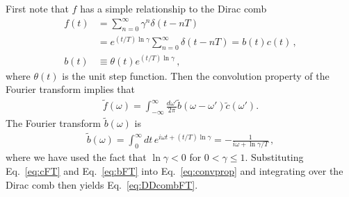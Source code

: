 \begin{refsection}
First note that $f$ has a simple relationship to the Dirac comb
\begin{align}
f(t)&=\sum_{n=0}^{\infty}\gamma^n \delta(t-nT)
\nonumber \\ &
=e^{(t/T) \ln\gamma}\sum_{n=0}^{\infty} \delta(t-nT)
=b(t)c(t) \,, \\
b(t)& \equiv \theta(t)e^{(t/T) \ln\gamma} \,,
\end{align}
where $\theta(t)$ is the unit step function.
Then the convolution property of the Fourier transform implies that 
\begin{align}
\tilde f(\omega)=\int_{-\infty}^{\infty}\frac{d\omega'}{2\pi}\tilde b(\omega -\omega')\tilde c(\omega').
\label{eq:convprop}
\end{align}
The Fourier transform $\tilde b(\omega)$ is
\begin{align}
\tilde b(\omega)=\int_{0}^{\infty}dt \, e^{i \omega t + (t/T) \ln\gamma}=-\frac{1}{i\omega+\ln\gamma/T} \,,
\label{eq:bFT}
\end{align}
where we have used the fact that $\ln\gamma <0$ for $0<\gamma \leq 1$.
Substituting Eq.~\eqref{eq:cFT} and Eq.~\eqref{eq:bFT} into Eq.~\eqref{eq:convprop} and integrating over the Dirac comb then yields Eq.~\eqref{eq:DDcombFT}.





\printbibliography[heading=subbibliography]
\end{refsection}